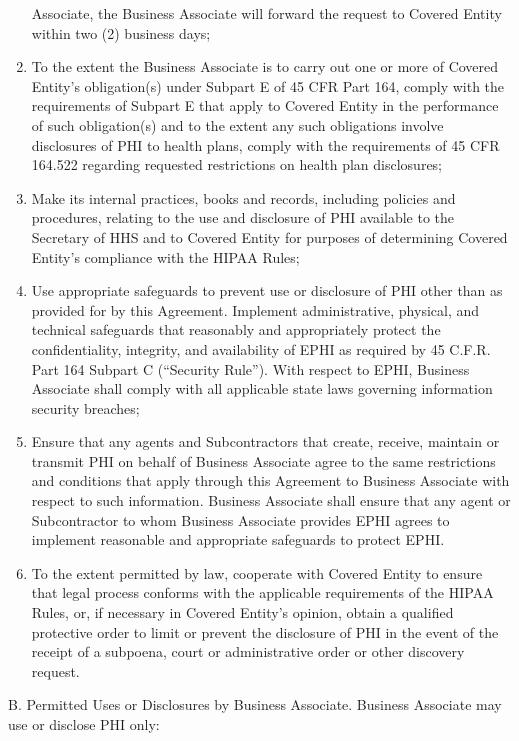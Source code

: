 \documentclass[11pt,a4paper]{article} %
\begin{document}
\begin{enumerate}
  Associate, the Business Associate will forward the request to Covered
  Entity within two (2) business days;
\item
  To the extent the Business Associate is to carry out one or more of
  Covered Entity's obligation(s) under Subpart E of 45 CFR Part 164,
  comply with the requirements of Subpart E that apply to Covered Entity
  in the performance of such obligation(s) and to the extent any such
  obligations involve disclosures of PHI to health plans, comply with
  the requirements of 45 CFR 164.522 regarding requested restrictions on
  health plan disclosures;
\item
  Make its internal practices, books and records, including policies and
  procedures, relating to the use and disclosure of PHI available to the
  Secretary of HHS and to Covered Entity for purposes of determining
  Covered Entity's compliance with the HIPAA Rules;
\item
  Use appropriate safeguards to prevent use or disclosure of PHI other
  than as provided for by this Agreement. Implement administrative,
  physical, and technical safeguards that reasonably and appropriately
  protect the confidentiality, integrity, and availability of EPHI as
  required by 45 C.F.R. Part 164 Subpart C (``Security Rule''). With
  respect to EPHI, Business Associate shall comply with all applicable
  state laws governing information security breaches;
\item
  Ensure that any agents and Subcontractors that create, receive,
  maintain or transmit PHI on behalf of Business Associate agree to the
  same restrictions and conditions that apply through this Agreement to
  Business Associate with respect to such information. Business
  Associate shall ensure that any agent or Subcontractor to whom
  Business Associate provides EPHI agrees to implement reasonable and
  appropriate safeguards to protect EPHI.
\item
  To the extent permitted by law, cooperate with Covered Entity to
  ensure that legal process conforms with the applicable requirements of
  the HIPAA Rules, or, if necessary in Covered Entity's opinion, obtain
  a qualified protective order to limit or prevent the disclosure of PHI
  in the event of the receipt of a subpoena, court or administrative
  order or other discovery request.
\end{enumerate}

B. Permitted Uses or Disclosures by Business Associate. Business
Associate may use or disclose PHI only:
\end{document}
